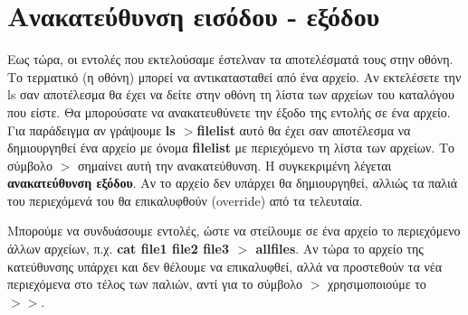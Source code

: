 






\section{Ανακατεύθυνση εισόδου - εξόδου}


Εως τώρα, οι εντολές που εκτελούσαμε έστελναν τα αποτελέσματά τους στην οθόνη. Το τερματικό  (η οθόνη) μπορεί να αντικατασταθεί από ένα αρχείο. Αν εκτελέσετε την ls σαν αποτέλεσμα θα έχει να δείτε στην οθόνη τη λίστα των αρχείων του καταλόγου που είστε. Θα μπορούσατε να ανακατευθύνετε την έξοδο της εντολής σε ένα αρχείο. Για παράδειγμα αν γράψουμε \textbf{ls $>$filelist} αυτό θα έχει σαν αποτέλεσμα να
δημιουργηθεί ένα αρχείο με όνομα \textbf{filelist} με περιεχόμενο τη λίστα των αρχείων. Το σύμβολο \textbf{$>$} σημαίνει αυτή την ανακατεύθυνση. Η συγκεκριμένη λέγεται \textbf{ανακατεύθυνση εξόδου}. Αν το αρχείο δεν υπάρχει θα δημιουργηθεί, αλλιώς τα παλιά του περιεχόμενά του θα επικαλυφθούν (override) από τα τελευταία.

Μπορούμε να συνδυάσουμε εντολές, ώστε να στείλουμε σε ένα αρχείο το περιεχόμενο άλλων αρχείων, π.χ. \textbf{cat file1 file2 file3 $>$ allfiles}. 
Αν τώρα το αρχείο της κατεύθυνσης υπάρχει και δεν θέλουμε να επικαλυφθεί, αλλά να προστεθούν τα νέα περιεχόμενα στο τέλος των παλιών, αντί για το σύμβολο \textbf{$>$} χρησιμοποιούμε το \textbf{$>>$}. 

